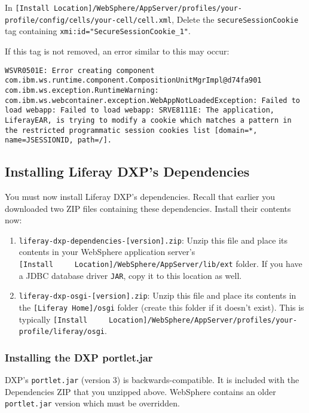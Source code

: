 In
\texttt{{[}Install\ Location{]}/WebSphere/AppServer/profiles/your-profile/config/cells/your-cell/cell.xml},
Delete the \texttt{secureSessionCookie} tag containing
\texttt{xmi:id="SecureSessionCookie\_1"}.

If this tag is not removed, an error similar to this may occur:

\begin{verbatim}
WSVR0501E: Error creating component com.ibm.ws.runtime.component.CompositionUnitMgrImpl@d74fa901    
com.ibm.ws.exception.RuntimeWarning: com.ibm.ws.webcontainer.exception.WebAppNotLoadedException: Failed to load webapp: Failed to load webapp: SRVE8111E: The application, LiferayEAR, is trying to modify a cookie which matches a pattern in the restricted programmatic session cookies list [domain=*, name=JSESSIONID, path=/].
\end{verbatim}

\subsection{Installing Liferay DXP's
Dependencies}\label{installing-liferay-dxps-dependencies}

You must now install Liferay DXP's dependencies. Recall that earlier you
downloaded two ZIP files containing these dependencies. Install their
contents now:

\begin{enumerate}
\def\labelenumi{\arabic{enumi}.}
\item
  \texttt{liferay-dxp-dependencies-{[}version{]}.zip}: Unzip this file
  and place its contents in your WebSphere application server's
  \texttt{{[}Install\ \ \ \ \ Location{]}/WebSphere/AppServer/lib/ext}
  folder. If you have a JDBC database driver \texttt{JAR}, copy it to
  this location as well.
\item
  \texttt{liferay-dxp-osgi-{[}version{]}.zip}: Unzip this file and place
  its contents in the \texttt{{[}Liferay\ Home{]}/osgi} folder (create
  this folder if it doesn't exist). This is typically
  \texttt{{[}Install\ \ \ \ \ Location{]}/WebSphere/AppServer/profiles/your-profile/liferay/osgi}.
\end{enumerate}

\subsubsection{Installing the DXP
portlet.jar}\label{installing-the-dxp-portlet.jar}

DXP's \texttt{portlet.jar} (version 3) is backwards-compatible. It is
included with the Dependencies ZIP that you unzipped above. WebSphere
contains an older \texttt{portlet.jar} version which must be overridden.

